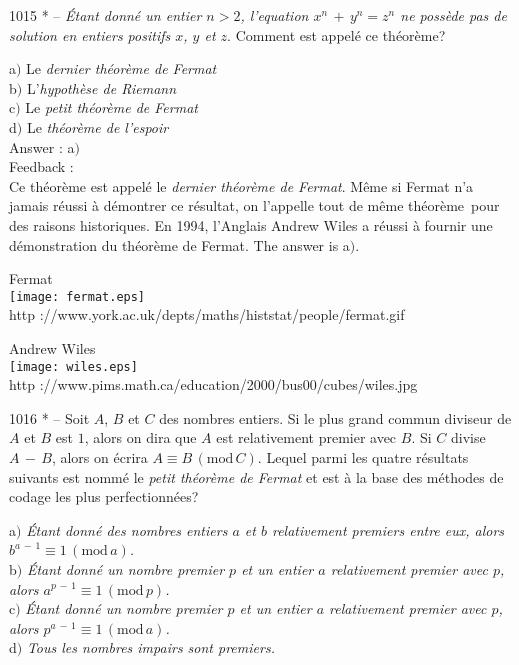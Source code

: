 \documentclass[letterpaper, 12pt]{article}
\begin{document}
1015 * -- {\sl \'Etant donn\'e un entier $n>2$, l'equation
$x^n\,+\,y^n=z^n$ ne poss\`ede pas de solution en entiers positifs
$x$, $y$ et $z$}. Comment est appel\'e ce th\'eor\`eme?

a$)$ Le {\sl dernier th\'eor\`eme de Fermat} \\
b$)$ L'{\sl hypoth\`ese de Riemann} \\
c$)$ Le {\sl petit th\'eor\`eme de Fermat} \\
d$)$ Le {\sl th\'eor\`eme de l'espoir}\\

Answer : a$)$\\

Feedback : \\
Ce th\'eor\`eme est appel\'e le {\sl dernier th\'eor\`eme de
Fermat}. M\^eme si Fermat n'a jamais r\'eussi \`a d\'emontrer ce
r\'esultat, on l'appelle tout de m\^eme \og th\'eor\`eme\fg\ pour
des raisons historiques. En 1994, l'Anglais Andrew Wiles a r\'eussi
\`a fournir une d\'emonstration du th\'eor\`eme de Fermat.
The answer is a$)$.\\

        \begin{center}
        Fermat\\
    \texttt{[image: fermat.eps]}\\
        {\footnotesize http
://www.york.ac.uk/depts/maths/histstat/people/fermat.gif}
    \end{center}

        \begin{center}
        Andrew Wiles\\
    \texttt{[image: wiles.eps]}\\
        {\footnotesize http
://www.pims.math.ca/education/2000/bus00/cubes/wiles.jpg}
    \end{center}

1016 * -- Soit $A$, $B$ et $C$ des nombres entiers. Si le plus grand
commun diviseur de $A$ et $B$ est $1$, alors on dira que $A$ est
relativement premier avec $B$. Si $C$ divise $A\,-\,B$, alors on
\'ecrira $A\equiv B\,(\mathrm{mod}\,C)$. Lequel parmi les quatre
r\'esultats suivants est nomm\'e le {\sl petit th\'eor\`eme de
Fermat} et est \`a la base des m\'ethodes de codage les plus
perfectionn\'ees?

a$)$ {\sl \'Etant donn\'e des nombres entiers $a$ et $b$ relativement
premiers entre eux, alors $b^{a\,-\,1}\equiv1\,(\mathrm{mod}\,a)$.} \\
b$)$ {\sl \'Etant donn\'e un nombre premier $p$ et un entier $a$
relativement premier avec $p$, alors
$a^{p\,-\,1}\equiv1\,(\mathrm{mod}\,p)$.} \\
c$)$ {\sl \'Etant donn\'e un nombre premier $p$ et un entier $a$
relativement premier avec $p$, alors
$p^{a\,-\,1}\equiv1\,(\mathrm{mod}\,a)$.} \\
d$)$ {\sl Tous les nombres impairs sont premiers.}\\
\end{document}
